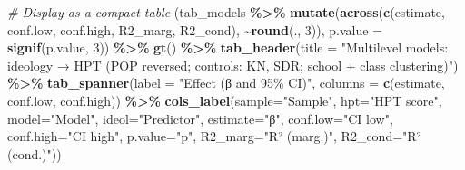 \documentclass[
  10pt,
]{article}
\newenvironment{Shaded}{\begin{snugshade}}{\end{snugshade}}
\newcommand{\AttributeTok}[1]{\textcolor[rgb]{0.13,0.29,0.53}{#1}}
\newcommand{\CommentTok}[1]{\textcolor[rgb]{0.56,0.35,0.01}{\textit{#1}}}
\newcommand{\DecValTok}[1]{\textcolor[rgb]{0.00,0.00,0.81}{#1}}
\newcommand{\FunctionTok}[1]{\textcolor[rgb]{0.13,0.29,0.53}{\textbf{#1}}}
\newcommand{\NormalTok}[1]{#1}
\newcommand{\SpecialCharTok}[1]{\textcolor[rgb]{0.81,0.36,0.00}{\textbf{#1}}}
\newcommand{\StringTok}[1]{\textcolor[rgb]{0.31,0.60,0.02}{#1}}
\begin{document}
\begin{Shaded}
\begin{Highlighting}[]
\CommentTok{\# Display as a compact table}
\NormalTok{(tab\_models }\SpecialCharTok{\%\textgreater{}\%}
  \FunctionTok{mutate}\NormalTok{(}\FunctionTok{across}\NormalTok{(}\FunctionTok{c}\NormalTok{(estimate, conf.low, conf.high, R2\_marg, R2\_cond), }\SpecialCharTok{\textasciitilde{}}\FunctionTok{round}\NormalTok{(., }\DecValTok{3}\NormalTok{)),}
         \AttributeTok{p.value =} \FunctionTok{signif}\NormalTok{(p.value, }\DecValTok{3}\NormalTok{)) }\SpecialCharTok{\%\textgreater{}\%}
  \FunctionTok{gt}\NormalTok{() }\SpecialCharTok{\%\textgreater{}\%}
  \FunctionTok{tab\_header}\NormalTok{(}\AttributeTok{title =} \StringTok{"Multilevel models: ideology → HPT (POP reversed; controls: KN, SDR; school + class clustering)"}\NormalTok{) }\SpecialCharTok{\%\textgreater{}\%}
  \FunctionTok{tab\_spanner}\NormalTok{(}\AttributeTok{label =} \StringTok{"Effect (β and 95\% CI)"}\NormalTok{, }\AttributeTok{columns =} \FunctionTok{c}\NormalTok{(estimate, conf.low, conf.high)) }\SpecialCharTok{\%\textgreater{}\%}
  \FunctionTok{cols\_label}\NormalTok{(}\AttributeTok{sample=}\StringTok{"Sample"}\NormalTok{, }\AttributeTok{hpt=}\StringTok{"HPT score"}\NormalTok{, }\AttributeTok{model=}\StringTok{"Model"}\NormalTok{, }\AttributeTok{ideol=}\StringTok{"Predictor"}\NormalTok{,}
             \AttributeTok{estimate=}\StringTok{"β"}\NormalTok{, }\AttributeTok{conf.low=}\StringTok{"CI low"}\NormalTok{, }\AttributeTok{conf.high=}\StringTok{"CI high"}\NormalTok{, }\AttributeTok{p.value=}\StringTok{"p"}\NormalTok{,}
             \AttributeTok{R2\_marg=}\StringTok{"R² (marg.)"}\NormalTok{, }\AttributeTok{R2\_cond=}\StringTok{"R² (cond.)"}\NormalTok{))}
\end{Highlighting}
\end{Shaded}
\end{document}

